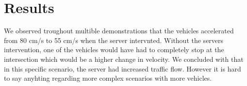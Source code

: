\section{Results}
We observed troughout multible demonstrations that the vehicles accelerated from 80 cm/s to 55 cm/s when the server intervnted. Without the servers intervention, one of the vehicles would have had to completely stop at the intersection which would be a higher change in velocity. We concluded with that in this specific scenario, the server had increased traffic flow. However it is hard to say anyhting regarding more complex scenarios with more vehicles.


